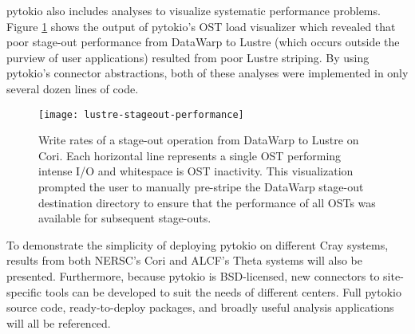 pytokio also includes analyses to visualize systematic performance problems.  Figure \ref{fig:lustre-heatmap} shows the output of pytokio's OST load visualizer which revealed that poor stage-out performance from DataWarp to Lustre (which occurs outside the purview of user applications) resulted from poor Lustre striping.  By using pytokio's connector abstractions, both of these analyses were implemented in only several dozen lines of code.

\begin{figure}[t]
    \centering
    \texttt{[image: lustre-stageout-performance]}
    \vspace{-.3in}
    \caption{Write rates of a stage-out operation from DataWarp to Lustre on Cori.  Each horizontal line represents a single OST performing intense I/O and whitespace is OST inactivity.  This visualization prompted the user to manually pre-stripe the DataWarp stage-out destination directory to ensure that the performance of all OSTs was available for subsequent stage-outs.}
    \label{fig:lustre-heatmap}
    \vspace{-.2in}
\end{figure}

To demonstrate the simplicity of deploying pytokio on different Cray systems, results from both NERSC's Cori and ALCF's Theta systems will also be presented.  Furthermore, because pytokio is BSD-licensed, new connectors to site-specific tools can be developed to suit the needs of different centers.  Full pytokio source code, ready-to-deploy packages, and broadly useful analysis applications will all be referenced.